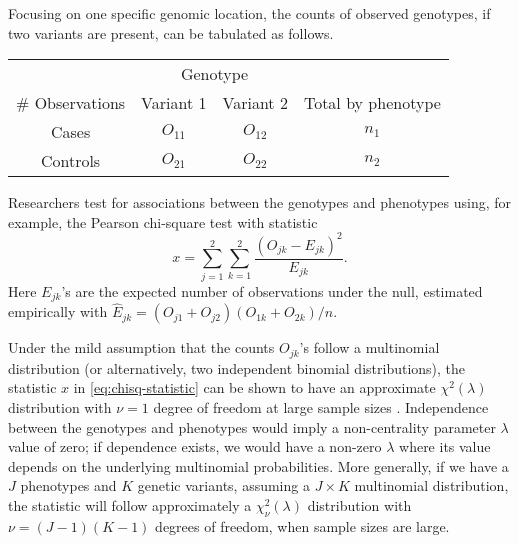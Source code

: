 Focusing on one specific genomic location, the counts of observed genotypes, if two variants are present, can be tabulated as follows.
\begin{center}
    \begin{tabular}{cccc}
    \hline
    & \multicolumn{2}{c}{Genotype} & \\
    \cline{2-3}
    \# Observations & Variant 1 & Variant 2 & Total by phenotype \\
    \hline
    Cases & $O_{11}$ & $O_{12}$ & $n_1$ \\
    Controls & $O_{21}$ & $O_{22}$ & $n_2$ \\
    \hline
    \end{tabular}
\end{center}
Researchers test for associations between the genotypes and phenotypes using, for example, the Pearson chi-square test with statistic
\begin{equation} \label{eq:chisq-statistic}
    x = \sum_{j=1}^2 \sum_{k=1}^2 \frac{(O_{jk} - E_{jk})^2}{E_{jk}}.
\end{equation}
Here $E_{jk}$'s are the expected number of observations under the null, estimated empirically with $\widehat{E}_{jk} = (O_{j1}+O_{j2})(O_{1k}+O_{2k})/n$.

Under the mild assumption that the counts $O_{jk}$'s follow a multinomial distribution (or alternatively, two independent binomial distributions), the statistic $x$ in \eqref{eq:chisq-statistic} can be shown to have an approximate $\chi^2(\lambda)$ distribution with $\nu=1$ degree of freedom at large sample sizes \citep{agresti2018introduction}. 
Independence between the genotypes and phenotypes would imply a non-centrality parameter $\lambda$ value of zero; if dependence exists, we would have a non-zero $\lambda$ where its value depends on the underlying multinomial probabilities.
More generally, if we have a $J$ phenotypes and $K$ genetic variants, assuming a $J\times K$ multinomial distribution, the statistic will follow approximately a $\chi^2_{\nu}(\lambda)$ distribution with $\nu = (J-1)(K-1)$ degrees of freedom, when sample sizes are large.

